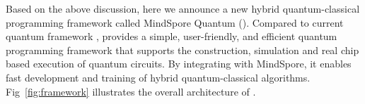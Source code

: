 Based on the above discussion, here we announce a new hybrid quantum-classical programming framework called MindSpore Quantum (\MindQuantum). Compared to current quantum framework \cite{jones2019quest,dou2022qpanda,zhang2023tensorcircuit,suzuki2021qulacs,broughton2020tensorflow,luo2020yao,guerreschi2020intel,bergholm2018pennylane}, \MindQuantum provides a simple, user-friendly, and efficient quantum programming framework that supports the construction, simulation and real chip based execution of quantum circuits. By integrating with MindSpore, it enables fast development and training of hybrid quantum-classical algorithms. Fig~\ref{fig:framework} illustrates the overall architecture of \MindQuantum.

\def \globalscale {1.000000}
